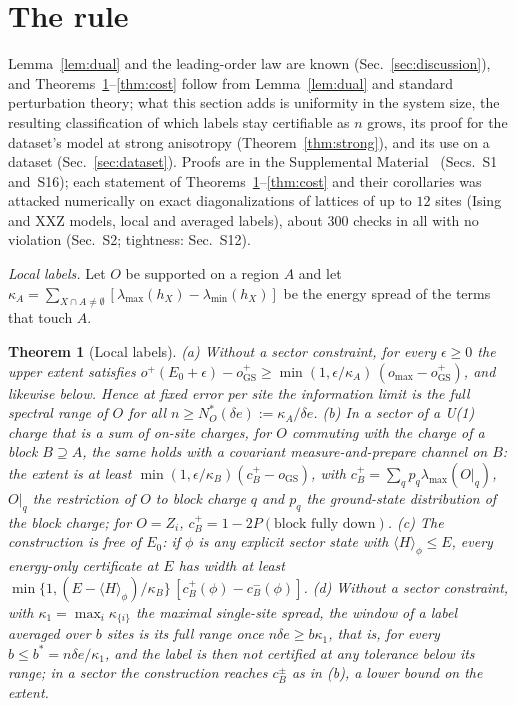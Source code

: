 \documentclass[aps,prx,twocolumn,10pt,superscriptaddress,nofootinbib,longbibliography,floatfix]{revtex4-2}
\newtheorem{theorem}{Theorem}
\theoremstyle{remark}
\newcommand{\de}{\delta e}
\newcommand{\GS}{\mathrm{GS}}
\begin{document}
\section{The rule}
\label{sec:rule}

Lemma~\ref{lem:dual} and the leading-order law are known (Sec.~\ref{sec:discussion}), and
Theorems~\ref{thm:local}--\ref{thm:cost} follow from Lemma~\ref{lem:dual} and standard perturbation theory; what this
section adds is uniformity in the system size, the resulting classification of which labels stay certifiable as $n$
grows, its proof for the dataset's model at strong anisotropy (Theorem~\ref{thm:strong}), and its use on a dataset
(Sec.~\ref{sec:dataset}).
Proofs are in the Supplemental Material~\cite{SM} (Secs.~S1 and~S16); each statement of %
Theorems~\ref{thm:local}--\ref{thm:cost} and their corollaries was attacked numerically on exact
diagonalizations of lattices of up to $12$ sites (Ising and XXZ %
models, local and averaged labels), about $300$ checks in all with no violation (Sec.~S2; tightness: Sec.~S12). %

\emph{Local labels.} Let $O$ be supported on a region $A$ and let
$\kappa_A=\sum_{X\cap A\neq\emptyset}[\lambda_{\max}(h_X)-\lambda_{\min}(h_X)]$ be the energy spread of the terms that
touch $A$.

\begin{theorem}[Local labels]
\label{thm:local}
(a) Without a sector constraint, for every $\epsilon\ge0$ the upper extent satisfies
$o^+(E_0+\epsilon)-o_\GS^+\ge\min(1,\epsilon/\kappa_A)\,(o_{\max}-o_\GS^+)$, and likewise below. Hence at fixed error
per site the information limit is the full spectral range of $O$ for all $n\ge N^*_O(\de):=\kappa_A/\de$.
(b) In a sector of a U(1) charge that is a sum of on-site charges, for $O$ commuting with the charge of a block
$B\supseteq A$, the same holds with a
covariant measure-and-prepare channel on $B$: the extent is at least $\min(1,\epsilon/\kappa_B)(c_B^+-o_\GS)$, with
$c_B^+=\sum_q p_q\lambda_{\max}(O|_q)$, $O|_q$ the restriction of $O$ to block charge $q$ and $p_q$ the ground-state
distribution of the block charge; for $O=Z_i$, $c_B^+=1-2P(\text{block fully down})$.
(c) The construction is free of $E_0$: if $\phi$ is any explicit sector state with $\langle H\rangle_\phi\le E$,
every energy-only certificate at $E$ has width at least
$\min\{1,(E-\langle H\rangle_\phi)/\kappa_B\}\,[c_B^+(\phi)-c_B^-(\phi)]$.
(d) Without a sector constraint, with $\kappa_1=\max_i\kappa_{\{i\}}$ the maximal single-site spread, the window of a
label averaged over $b$ sites is its full range once $n\de\ge b\kappa_1$, that is, for every $b\le b^*=n\de/\kappa_1$,
and the label is then not certified at any tolerance below its range; in a sector the construction reaches
$c_B^\pm$ as in (b), a lower bound on the extent.
\end{theorem}
\end{document}
